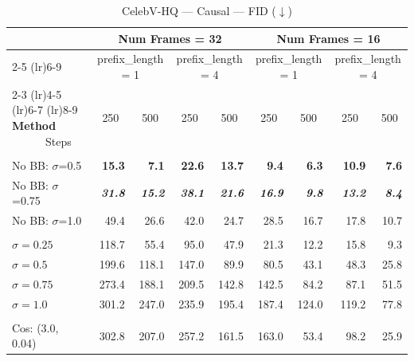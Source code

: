 \begin{table}[htbp]
\centering\footnotesize
\caption{CelebV-HQ --- Causal --- FID ($\downarrow$)}
\label{tab:celebvhq_causal_CAUSAL_EVAL_fid}
\begin{tabular}{lrrrrrrrr}
\toprule
 & \multicolumn{4}{c}{Num Frames = 32} & \multicolumn{4}{c}{Num Frames = 16} \\
\cmidrule(lr){2-5} \cmidrule(lr){6-9}
 & \multicolumn{2}{c}{prefix\_length = 1} & \multicolumn{2}{c}{prefix\_length = 4} & \multicolumn{2}{c}{prefix\_length = 1} & \multicolumn{2}{c}{prefix\_length = 4} \\
\cmidrule(lr){2-3} \cmidrule(lr){4-5} \cmidrule(lr){6-7} \cmidrule(lr){8-9}
\textbf{Method} \ \ \ \ \ \ Steps & \multicolumn{1}{c}{250} & \multicolumn{1}{c}{500} & \multicolumn{1}{c}{250} & \multicolumn{1}{c}{500} & \multicolumn{1}{c}{250} & \multicolumn{1}{c}{500} & \multicolumn{1}{c}{250} & \multicolumn{1}{c}{500} \\
\midrule
\rowcolor{gray!20} \multicolumn{9}{l}{\textit{ABC}} \\
\quad No BB: $\sigma$=0.5 & \textbf{15.3} & \textbf{7.1} & \textbf{22.6} & \textbf{13.7} & \textbf{9.4} & \textbf{6.3} & \textbf{10.9} & \textbf{7.6} \\
\quad No BB: $\sigma$=0.75 & \textbf{\textit{31.8}} & \textbf{\textit{15.2}} & \textbf{\textit{38.1}} & \textbf{\textit{21.6}} & \textbf{\textit{16.9}} & \textbf{\textit{9.8}} & \textbf{\textit{13.2}} & \textbf{\textit{8.4}} \\
\quad No BB: $\sigma$=1.0 & 49.4 & 26.6 & 42.0 & 24.7 & 28.5 & 16.7 & 17.8 & 10.7 \\
\rowcolor{gray!20} \multicolumn{9}{l}{\textit{Conditional Diffusion Bridge}} \\
\quad $\sigma=0.25$ & 118.7 & 55.4 & 95.0 & 47.9 & 21.3 & 12.2 & 15.8 & 9.3 \\
\quad $\sigma=0.5$ & 199.6 & 118.1 & 147.0 & 89.9 & 80.5 & 43.1 & 48.3 & 25.8 \\
\quad $\sigma=0.75$ & 273.4 & 188.1 & 209.5 & 142.8 & 142.5 & 84.2 & 87.1 & 51.5 \\
\quad $\sigma=1.0$ & 301.2 & 247.0 & 235.9 & 195.4 & 187.4 & 124.0 & 119.2 & 77.8 \\
\rowcolor{gray!20} \multicolumn{9}{l}{\textit{Noise-to-Data Diffusion}} \\
\quad Cos: (3.0, 0.04) & 302.8 & 207.0 & 257.2 & 161.5 & 163.0 & 53.4 & 98.2 & 25.9 \\
\bottomrule
\end{tabular}
\end{table}

